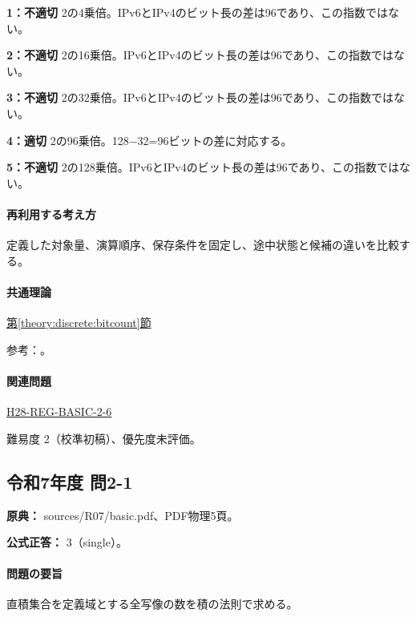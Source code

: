 \noindent\textbf{1：不適切} 2の4乗倍。IPv6とIPv4のビット長の差は96であり、この指数ではない。\par

\noindent\textbf{2：不適切} 2の16乗倍。IPv6とIPv4のビット長の差は96であり、この指数ではない。\par

\noindent\textbf{3：不適切} 2の32乗倍。IPv6とIPv4のビット長の差は96であり、この指数ではない。\par

\noindent\textbf{4：適切} 2の96乗倍。128−32=\allowbreak{}96ビットの差に対応する。\par

\noindent\textbf{5：不適切} 2の128乗倍。IPv6とIPv4のビット長の差は96であり、この指数ではない。\par

\paragraph{再利用する考え方} 定義した対象量、演算順序、保存条件を固定し、途中状態と候補の違いを比較する。

\paragraph{共通理論} \hyperref[theory:discrete:bitcount]{第\ref*{theory:discrete:bitcount}節}

\par 参考：\cite{rfc4291_addresses}。

\paragraph{関連問題} \hyperref[q:h28-reg-basic-2-6]{H28-REG-BASIC-2-6}

\par 難易度 2（校準初稿）、優先度未評価。

\subsection{令和7年度 問2-1}
\label{q:r07-reg-basic-2-1}

\noindent\textbf{原典：} sources/R07/basic.pdf、PDF物理5頁。

\textbf{公式正答：} 3（single）。

\paragraph{問題の要旨} 直積集合を定義域とする全写像の数を積の法則で求める。

